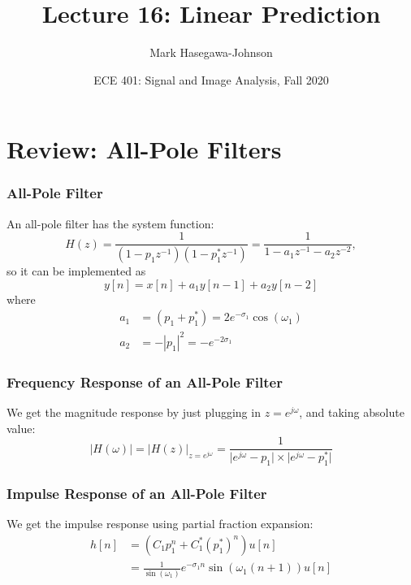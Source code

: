 \documentclass{beamer}
\title{Lecture 16: Linear Prediction}
\author{Mark Hasegawa-Johnson}
\date{ECE 401: Signal and Image Analysis, Fall 2020}
\begin{document}
\begin{frame}
  \maketitle
\end{frame}

\begin{frame}
  \tableofcontents
\end{frame}

\section[Review]{Review: All-Pole Filters}
\setcounter{subsection}{1}

\begin{frame}
  \frametitle{All-Pole Filter}

  An all-pole filter has the system function:
  \begin{displaymath}
  H(z) = \frac{1}{(1-p_1z^{-1})(1-p_1^*z^{-1})}= \frac{1}{1-a_1z^{-1}-a_2z^{-2}},
  \end{displaymath}
  so it can be implemented as
  \begin{displaymath}
    y[n] = x[n] + a_1y[n-1] + a_2y[n-2]
  \end{displaymath}
  where
  \begin{align*}
    a_1 &= (p_1+p_1^*) = 2e^{-\sigma_1}\cos(\omega_1)\\
    a_2 &= -|p_1|^2 = -e^{-2\sigma_1}
  \end{align*}
\end{frame}

\begin{frame}
  \frametitle{Frequency Response of an All-Pole Filter}

  We get the magnitude response by just plugging in $z=e^{j\omega}$,
  and taking absolute value:
  \begin{displaymath}
    |H(\omega)| = \lvert H(z)\rvert_{z=e^{j\omega}} = \frac{1}{\lvert e^{j\omega}-p_1\rvert\times\lvert e^{j\omega}-p_1^*\rvert}
  \end{displaymath}
  \centerline{}
\end{frame}

\begin{frame}
  \frametitle{Impulse Response of an All-Pole Filter}

  We get the impulse response using partial fraction expansion:
  \begin{align*}
    h[n] &= \left(C_1p_1^n + C_1^* (p_1^*)^n\right) u[n]\\
    &=\frac{1}{\sin(\omega_1)} e^{-\sigma_1n}\sin\left(\omega_1(n+1)\right)u[n]
  \end{align*}
  \centerline{}
\end{frame}
\end{document}
